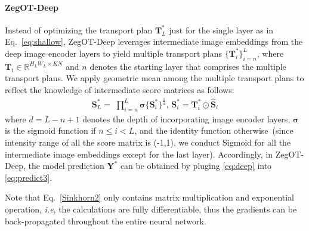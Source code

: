 \documentclass[nohyperref]{article}
\newcommand{\bs}{\boldsymbol}
\newcommand{\asty}{{\mathbf{Y}^*}}
\theoremstyle{plain}
\theoremstyle{definition}
\theoremstyle{remark}
\begin{document}
\paragraph{ZegOT-Deep}
Instead of optimizing the transport plan $\bs{T}^{\ast}_L$ just for the single layer as in Eq.~\eqref{eq:shallow},  ZegOT-Deep leverages intermediate image embeddings from the deep image encoder layers  to yield multiple
transport plans $\{\bs{T}^{\ast}_i\}_{i=n}^L$,
where $\bs{T}_i \in \mathbb{R}^{H_LW_L \times K N}$ and $n$ denotes the starting layer that comprises the multiple transport plans.
We apply geometric mean among the multiple transport plans to reflect the knowledge of intermediate score matrices as follows: 
\begin{eqnarray}
\bs{S}^{\ast}_L = \; \prod^{L}_{i=n} \bs{\sigma}\{\bs{S}^{\ast}_i\}^{\frac{1}{d}}, \, \bs{S}^{\ast}_i= \bs{T}^{\ast}_i \odot\bs{\hat S}_i
\label{eq:deep}
\end{eqnarray}
where $d = L - n + 1$ denotes the depth of incorporating image encoder layers, $\bs{\sigma}$ is the sigmoid function if $n\leq i<L$, and the identity function otherwise~(since intensity range of all the score matrix is (-1,1), we conduct Sigmoid for all the intermediate image embeddings except for the last layer).
Accordingly, in ZegOT-Deep, the model prediction $\asty$ can be obtained by pluging \eqref{eq:deep} into \eqref{eq:predict3}.

Note that Eq.~\eqref{Sinkhorn2} only contains matrix multiplication and exponential operation, \textit{i.e}, the calculations are fully differentiable, thus the gradients can be back-propagated throughout the entire neural network. 


\end{document}
